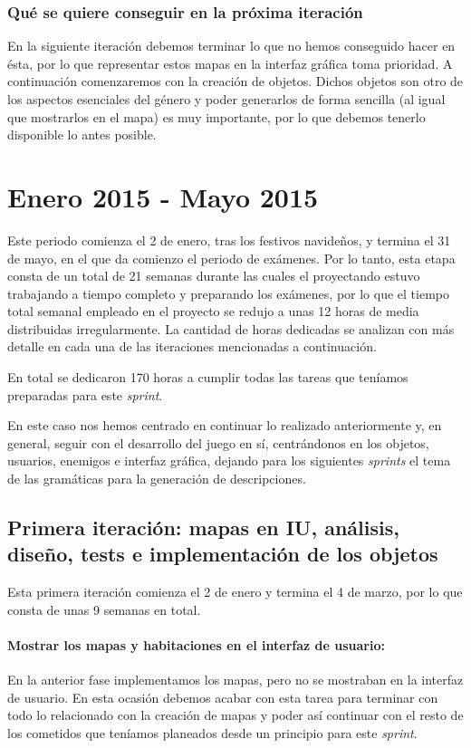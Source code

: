 \subsubsection{Qué se quiere conseguir en la próxima iteración}

En la siguiente iteración debemos terminar lo que no hemos conseguido hacer en ésta, por lo que representar estos mapas en la interfaz gráfica toma prioridad. A continuación comenzaremos con la creación de objetos. Dichos objetos son otro de los aspectos esenciales del género y poder generarlos de forma sencilla (al igual que mostrarlos en el mapa) es muy importante, por lo que debemos tenerlo disponible lo antes posible.

\section{Enero 2015 - Mayo 2015}

Este periodo comienza el 2 de enero, tras los festivos navideños, y termina el 31 de mayo, en el que da comienzo el periodo de exámenes. Por lo tanto, esta etapa consta de un total de 21 semanas durante las cuales el proyectando estuvo trabajando a tiempo completo y preparando los exámenes, por lo que el tiempo total semanal empleado en el proyecto se redujo a unas 12 horas de media distribuidas irregularmente. La cantidad de horas dedicadas se analizan con más detalle en cada una de las iteraciones mencionadas a continuación.

En total se dedicaron 170 horas a cumplir todas las tareas que teníamos preparadas para este \textit{sprint}.

En este caso nos hemos centrado en continuar lo realizado anteriormente y, en general, seguir con el desarrollo del juego en sí, centrándonos en los objetos, usuarios, enemigos e interfaz gráfica, dejando para los siguientes \textit{sprints} el tema de las gramáticas para la generación de descripciones.

\subsection{Primera iteración: mapas en IU, análisis, diseño, tests e implementación de los objetos}

Esta primera iteración comienza el 2 de enero y termina el 4 de marzo, por lo que consta de unas 9 semanas en total.

\paragraph{Mostrar los mapas y habitaciones en el interfaz de usuario:} En la anterior fase implementamos los mapas, pero no se mostraban en la interfaz de usuario. En esta ocasión debemos acabar con esta tarea para terminar con todo lo relacionado con la creación de mapas y poder así continuar con el resto de los cometidos que teníamos planeados desde un principio para este \textit{sprint}.

